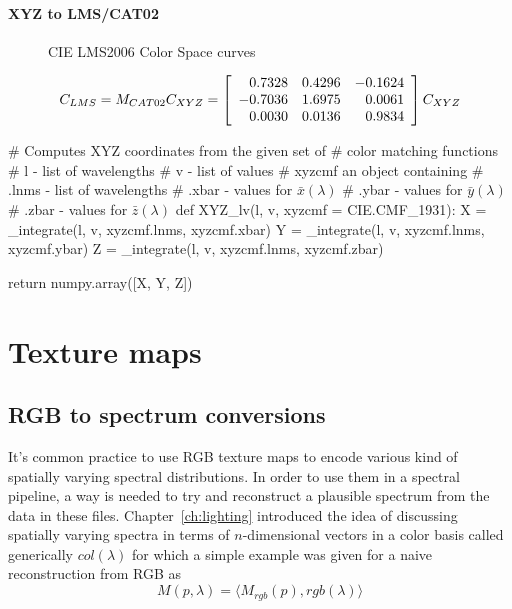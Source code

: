 \ifomit
\paragraph{XYZ to LMS/CAT02}

\begin{figure}
\centering

\caption{CIE LMS2006 Color Space curves}
\label{fig:cielms2006}
\end{figure}

\begin{displaymath}
C_{LMS} = M_{CAT02} C_{XYZ}  = \left[\begin{array}{r@{.}lr@{.}lr@{.}l}
 0&7328 & 0&4296 & -0&1624 \\
-0&7036 & 1&6975 &  0&0061 \\
 0&0030 & 0&0136 &  0&9834 \\
\end{array}\right] C_{XYZ}
\end{displaymath}
\fi


\begin{pythoncode}
# Computes XYZ coordinates from the given set of
# color matching functions
# l - list of wavelengths
# v - list of values
# xyzcmf an object containing
# .lnms - list of wavelengths
# .xbar - values for $\bar{x}(\lambda)$
# .ybar - values for $\bar{y}(\lambda)$
# .zbar - values for $\bar{z}(\lambda)$
def XYZ_lv(l, v, xyzcmf = CIE.CMF_1931):
    X = _integrate(l, v, xyzcmf.lnms, xyzcmf.xbar)
    Y = _integrate(l, v, xyzcmf.lnms, xyzcmf.ybar)
    Z = _integrate(l, v, xyzcmf.lnms, xyzcmf.zbar)

    return numpy.array([X, Y, Z])
\end{pythoncode}


\section{Texture maps}
\label{sec:implementation:texturemaps}

\subsection{RGB to spectrum conversions}

It's common practice to use \gls{RGB} texture maps to encode various
kind of spatially varying spectral distributions. In order to use them
in a spectral pipeline, a way is needed to try and reconstruct a plausible
spectrum from the data in these files. Chapter~\ref{ch:lighting} introduced
the idea of discussing spatially varying spectra in terms of $n$-dimensional
vectors in a color basis called generically $col(\lambda)$ for which a
simple example was given for a naive reconstruction from \gls{RGB} as
\begin{displaymath}
M(p,\lambda) = \big\langle M_{rgb}(p), rgb(\lambda) \big\rangle
\end{displaymath}

